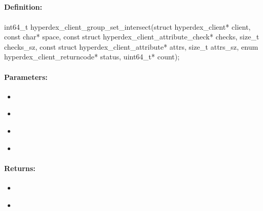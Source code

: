 \pagebreak
\subsection{}
\label{api:c:group_set_intersect}


\paragraph{Definition:}
\begin{ccode}
int64_t hyperdex_client_group_set_intersect(struct hyperdex_client* client,
        const char* space,
        const struct hyperdex_client_attribute_check* checks, size_t checks_sz,
        const struct hyperdex_client_attribute* attrs, size_t attrs_sz,
        enum hyperdex_client_returncode* status,
        uint64_t* count);
\end{ccode}

\paragraph{Parameters:}
\begin{itemize}[noitemsep]
\item {}\\

\item {}\\

\item {}\\

\item {}\\

\end{itemize}

\paragraph{Returns:}
\begin{itemize}[noitemsep]
\item {}\\

\item {}\\

\end{itemize}

